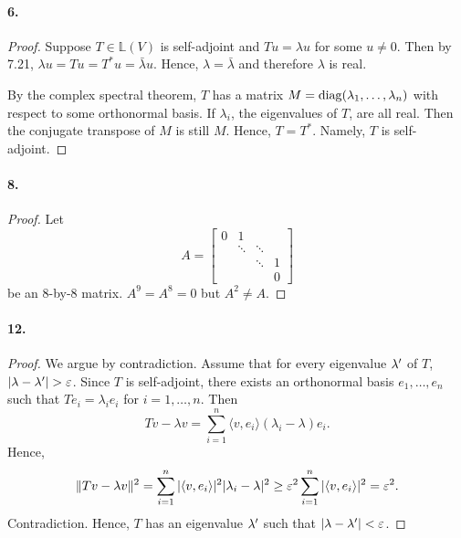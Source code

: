   \paragraph{6.}
  \begin{proof}
    Suppose $T\in\mathbb{L}(V)$ is self-adjoint and $Tu=\lambda u$ for some $u
    \ne 0$. Then by 7.21, $\lambda u = Tu=T^*u=\bar{\lambda}u$. Hence, $\lambda
    =\bar{\lambda}$ and therefore $\lambda$ is real.\par
    By the complex spectral theorem, $T$ has a matrix $M=\operatorname{diag}(\lambda_1,\dots,
    \lambda_n)$ with respect to some orthonormal basis. If $\lambda_i$, the 
    eigenvalues of $T$, are all real. Then the conjugate transpose of $M$ is 
    still $M$. Hence, $T=T^*$. Namely, $T$ is self-adjoint.
  \end{proof}

  \paragraph{8.}
  \begin{proof}
    Let
    \[
      A = \begin{bmatrix}
        0 & 1      &        &   \\
          & \ddots & \ddots &   \\
          &        & \ddots & 1 \\
          &        &        & 0
      \end{bmatrix}      
    \]
    be an $8$-by-$8$ matrix. $A^9=A^8=0$ but $A^2\ne A$.
  \end{proof}

  \paragraph{12.}
  \begin{proof}
    We argue by contradiction. Assume that for every eigenvalue $\lambda^\prime$ of 
    $T$, $|\lambda-\lambda\hp|>\vep$. Since $T$ is self-adjoint, there exists an
    orthonormal basis $e_1,\dots,e_n$ such that $Te_i=\lambda_ie_i$ for $i=1,
    \dots,n$. Then
    \[
      Tv-\lambda v = \sum_{i=1}^n\langle v,e_i\rangle(\lambda_i-\lambda)e_i.
    \]
    Hence, 
    \[
      \|Tv-\lambda v\|^2 
      = \sum_{i=1}^n |\langle v,e_i\rangle|^2|\lambda_i-\lambda|^2
      \ge \varepsilon^2\sum_{i=1}^n |\langle v,e_i\rangle|^2 = \varepsilon^2.
    \]
    Contradiction. Hence, $T$ has an eigenvalue $\lambda^\prime$ such that $|\lambda
    -\lambda^\prime|<\varepsilon$.
  \end{proof}


